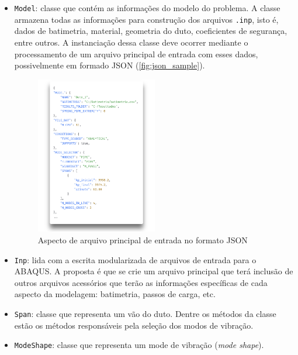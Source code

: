 \begin{itemize}
    \item \texttt{Model}: classe que contém as informações do modelo do problema.
    A classe armazena todas as informações para construção dos arquivos \texttt{.inp}, isto é, dados de batimetria, material, geometria do duto, coeficientes de segurança, entre outros.
    A instanciação dessa classe deve ocorrer mediante o processamento de um arquivo principal de entrada com esses dados, possivelmente em formado JSON (\autoref{fig:json_sample}).

    \begin{figure}[!ht]
        \centering
        \caption{Aspecto de arquivo principal de entrada no formato JSON}\label{fig:json_sample}
        \includegraphics[width=0.5\textwidth]{imagens/json_sample}
    \end{figure}
 
    \item \texttt{Inp}: lida com a escrita modularizada de arquivos de entrada  para o ABAQUS. A proposta é que se crie um arquivo principal que terá inclusão de outros arquivos acessórios que terão as informações específicas de cada aspecto da modelagem: batimetria, passos de carga, etc.
    
    \item \texttt{Span}: classe que representa um vão do duto. Dentre os métodos da classe estão os métodos responsáveis pela seleção dos modos de vibração.
    
    \item \texttt{ModeShape}: classe que representa um mode de vibração (\textit{mode shape}).
\end{itemize}

